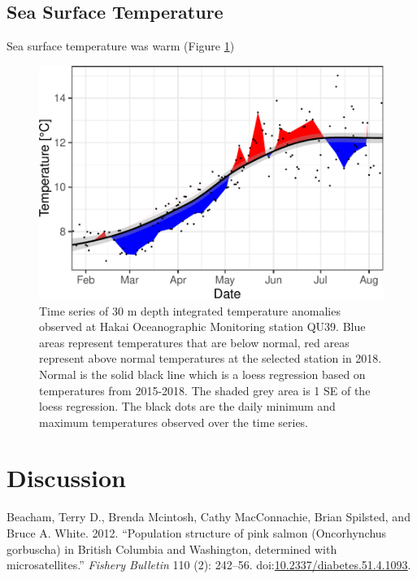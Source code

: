 \documentclass[fleqn,10pt]{wlpeerj} %
\begin{document}
\subsection*{Sea Surface Temperature}\label{sea-surface-temperature}

Sea surface temperature was warm (Figure \ref{fig:sst})

\begin{figure}[H]
\includegraphics[width=0.8\linewidth]{peer_j_migration_dynamics_files/figure-latex/sst-1} \caption{Time series of 30 m depth integrated temperature anomalies observed at Hakai Oceanographic Monitoring station QU39. Blue areas represent temperatures that are below normal, red areas represent above normal temperatures at the selected station in 2018. Normal is the solid black line which is a loess regression based on temperatures from 2015-2018. The shaded grey area is 1 SE of the loess regression. The black dots are the daily minimum and maximum temperatures observed over the time series.}\label{fig:sst}
\end{figure}

\section*{Discussion}\label{discussion}

\hypertarget{refs}{}
\hypertarget{ref-Beacham2012}{}
Beacham, Terry D., Brenda Mcintosh, Cathy MacConnachie, Brian Spilsted,
and Bruce A. White. 2012. ``Population structure of pink salmon
(Oncorhynchus gorbuscha) in British Columbia and Washington, determined
with microsatellites.'' \emph{Fishery Bulletin} 110 (2): 242--56.
doi:\href{https://doi.org/10.2337/diabetes.51.4.1093}{10.2337/diabetes.51.4.1093}.
\end{document}
